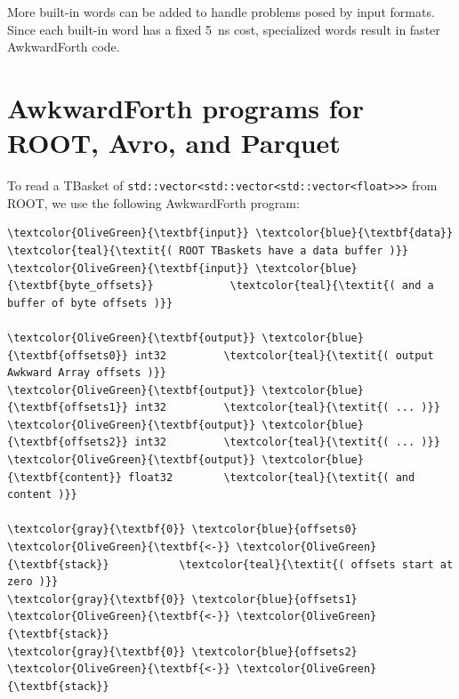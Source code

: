 \documentclass{webofc}
\begin{document}
More built-in words can be added to handle problems posed by input formats. Since each built-in word has a fixed 5~ns cost, specialized words result in faster AwkwardForth code.

\section{AwkwardForth programs for ROOT, Avro, and Parquet}
\label{sec:programs}

To read a TBasket of \texttt{std::vector<std::vector<std::vector<float>>>} from ROOT, we use the following AwkwardForth program:

\begin{Verbatim}[commandchars=\\\{\}]
\textcolor{OliveGreen}{\textbf{input}} \textcolor{blue}{\textbf{data}}                    \textcolor{teal}{\textit{( ROOT TBaskets have a data buffer )}}
\textcolor{OliveGreen}{\textbf{input}} \textcolor{blue}{\textbf{byte_offsets}}            \textcolor{teal}{\textit{( and a buffer of byte offsets )}}

\textcolor{OliveGreen}{\textbf{output}} \textcolor{blue}{\textbf{offsets0}} int32         \textcolor{teal}{\textit{( output Awkward Array offsets )}}
\textcolor{OliveGreen}{\textbf{output}} \textcolor{blue}{\textbf{offsets1}} int32         \textcolor{teal}{\textit{( ... )}}
\textcolor{OliveGreen}{\textbf{output}} \textcolor{blue}{\textbf{offsets2}} int32         \textcolor{teal}{\textit{( ... )}}
\textcolor{OliveGreen}{\textbf{output}} \textcolor{blue}{\textbf{content}} float32        \textcolor{teal}{\textit{( and content )}}

\textcolor{gray}{\textbf{0}} \textcolor{blue}{offsets0} \textcolor{OliveGreen}{\textbf{<-}} \textcolor{OliveGreen}{\textbf{stack}}           \textcolor{teal}{\textit{( offsets start at zero )}}
\textcolor{gray}{\textbf{0}} \textcolor{blue}{offsets1} \textcolor{OliveGreen}{\textbf{<-}} \textcolor{OliveGreen}{\textbf{stack}}
\textcolor{gray}{\textbf{0}} \textcolor{blue}{offsets2} \textcolor{OliveGreen}{\textbf{<-}} \textcolor{OliveGreen}{\textbf{stack}}


\end{Verbatim}
\end{document}

